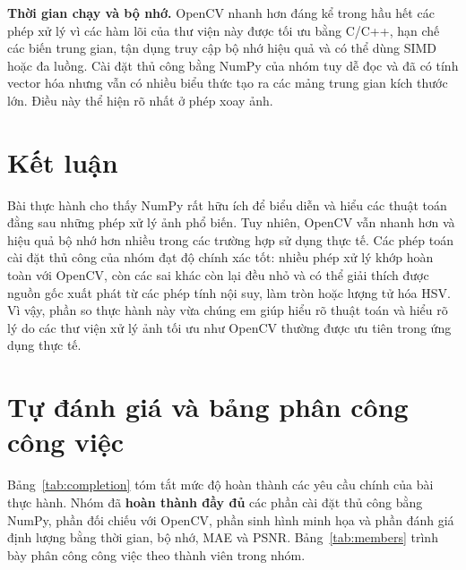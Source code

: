 \documentclass[12pt]{article}
\newcommand{\runin}[1]{\par\medskip\noindent\textbf{#1}\hspace{0.4em}\ignorespaces}
\numberwithin{equation}{section}
\begin{document}
\runin{Thời gian chạy và bộ nhớ.} OpenCV nhanh hơn đáng kể trong hầu hết các phép xử
lý vì các hàm lõi của thư viện này được tối ưu bằng C/C++, hạn chế các biến trung gian, tận dụng truy
cập bộ nhớ hiệu quả và có thể dùng SIMD hoặc đa luồng. Cài đặt thủ công bằng NumPy của nhóm tuy dễ đọc và
đã có tính vector hóa nhưng vẫn có nhiều biểu thức tạo ra các mảng trung gian kích thước lớn. Điều này thể hiện rõ nhất ở phép xoay ảnh.

\section{Kết luận}

Bài thực hành cho thấy NumPy rất hữu ích để biểu diễn và hiểu các thuật toán
đằng sau những phép xử lý ảnh phổ biến. Tuy nhiên, OpenCV vẫn nhanh hơn và hiệu
quả bộ nhớ hơn nhiều trong các trường hợp sử dụng thực tế. Các phép toán cài đặt thủ công của nhóm
đạt độ chính xác tốt: nhiều phép xử lý khớp hoàn toàn với OpenCV, còn các sai
khác còn lại đều nhỏ và có thể giải thích được nguồn gốc xuất phát từ các phép tính nội suy, làm tròn hoặc lượng tử
hóa HSV. Vì vậy, phần so thực hành này vừa chúng em giúp hiểu rõ thuật toán và hiểu rõ lý do
các thư viện xử lý ảnh tối ưu như OpenCV thường được ưu tiên trong ứng dụng thực tế.

\section{Tự đánh giá và bảng phân công công việc}

Bảng~\ref{tab:completion} tóm tắt mức độ hoàn thành các yêu cầu chính của bài
thực hành. Nhóm đã \textbf{hoàn thành đầy đủ} các phần cài đặt thủ công bằng NumPy, phần
đối chiếu với OpenCV, phần sinh hình minh họa và phần đánh giá định lượng bằng
thời gian, bộ nhớ, MAE và PSNR.
Bảng~\ref{tab:members} trình bày phân công công việc theo thành viên trong nhóm.
\end{document}
